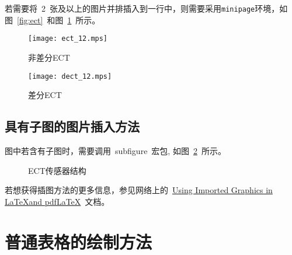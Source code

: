 若需要将~2~张及以上的图片并排插入到一行中，则需要采用\verb|minipage|环境，如图~\ref{fig:ect}~和图~\ref{fig:dect}~所示。
\begin{figure}[htbp]
\centering
\begin{minipage}{0.4\textwidth}
\centering
\texttt{[image: ect\_12.mps]}
\caption{非差分ECT}\label{fig:ect}
\end{minipage}
\hspace{0.1\textwidth}
\begin{minipage}{0.4\textwidth}
\centering
\texttt{[image: dect\_12.mps]}
\caption{差分ECT}\label{fig:dect}
\end{minipage}
\vspace{\baselineskip}
\end{figure}
  

\subsection{具有子图的图片插入方法}

图中若含有子图时，需要调用~subfigure~宏包, 如图~\ref{fig:subfig}~所示。
\begin{figure}[htbp]
  \centering
  \caption{ECT传感器结构}\label{fig:subfig}
\vspace{\baselineskip}
\end{figure}

若想获得插图方法的更多信息，参见网络上的~\href{ftp://ftp.tex.ac.uk/tex-archive/info/epslatex.pdf}{Using Imported Graphics in \LaTeX and pdf\LaTeX}~文档。 



\section{普通表格的绘制方法}

